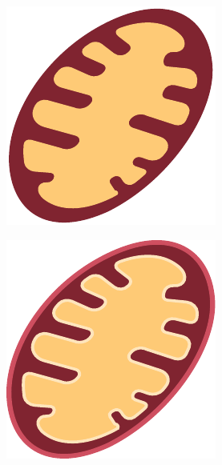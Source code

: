\begin{figure}[H]
\begin{subfigure}[t]{0.2\linewidth}
    \end{subfigure}
    \begin{subfigure}[t]{0.2\linewidth}
        \includegraphics[width=\textwidth]{chapters/images/mitochondria-no-lines}
    \end{subfigure}
    \begin{subfigure}[t]{0.2\linewidth}
        \includegraphics[width=\textwidth]{chapters/images/mitochondria-color-lines}

\end{subfigure}
\end{figure}
